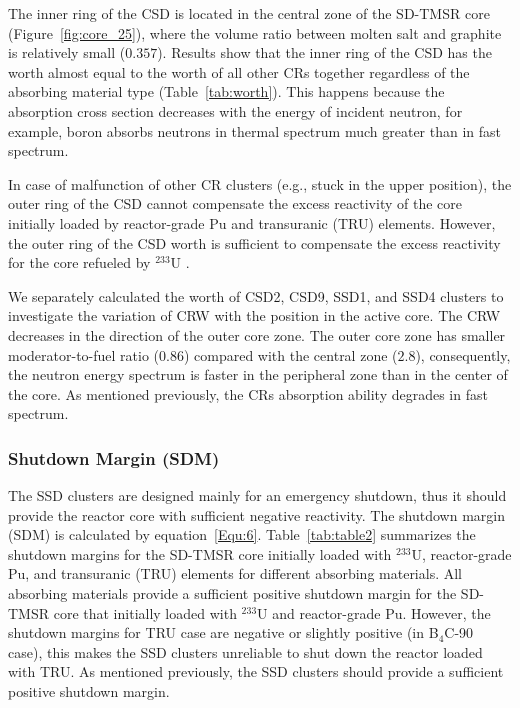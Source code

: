 The inner ring of the CSD is located in the central zone of the SD-TMSR core 
(Figure~\ref{fig:core_25}), where the volume ratio between molten salt and 
graphite is relatively small ($0.357$). Results show that the inner ring of the CSD has 
the worth almost equal to the worth of all other CRs together regardless of 
the absorbing material type (Table~\ref{tab:worth}). This happens because the absorption cross section
decreases with the energy of incident neutron, for example, boron absorbs neutrons in thermal spectrum much 
greater than in fast spectrum.

In case of malfunction of other CR clusters (e.g., stuck in the upper 
position), the outer ring of the CSD cannot compensate the excess 
reactivity of the core initially loaded by reactor-grade Pu and transuranic 
(TRU) elements. However, the outer ring of the CSD worth is sufficient 
to compensate the excess reactivity for the core refueled by $^{233}$U . 

We separately calculated the worth of CSD2, CSD9, SSD1, and SSD4 clusters to 
investigate the variation of CRW with the position in the active core.
The CRW decreases in the direction of the outer core zone. The outer core zone 
has smaller moderator-to-fuel ratio ($0.86$) compared with the central zone 
($2.8$), consequently, the neutron energy spectrum is faster in the peripheral 
zone than in the center of the core. As mentioned previously, the CRs 
absorption ability degrades in fast spectrum.

\subsubsection{Shutdown Margin (SDM)}

The SSD clusters are designed mainly for an emergency shutdown, thus it should 
provide the reactor core with sufficient negative reactivity. The 
shutdown margin (SDM) is calculated by equation~\ref{Equ:6}.
Table~\ref{tab:table2} summarizes the shutdown margins for the SD-TMSR core 
initially loaded with $^{233}$U, reactor-grade Pu, and transuranic (TRU) 
elements for different absorbing materials. All absorbing materials provide a sufficient positive
shutdown margin for the SD-TMSR core that initially loaded with 
$^{233}$U and reactor-grade Pu. However, the shutdown margins for TRU case are 
negative or slightly positive (in B$_4$C-90 case), this makes the SSD clusters 
unreliable to shut down the reactor loaded with TRU.
As mentioned previously, the SSD clusters should 
provide a sufficient positive shutdown margin.

